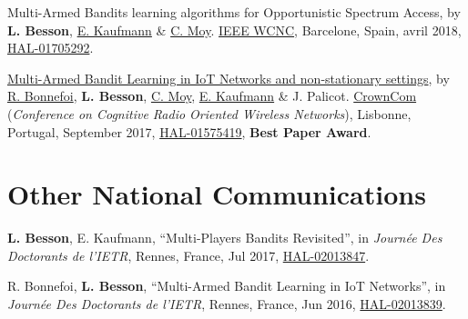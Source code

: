 \begin{etaremune}
{  Multi-Armed Bandits learning algorithms for Opportunistic Spectrum
  Access}, by \textbf{L. Besson},
  \href{http://chercheurs.lille.inria.fr/ekaufman/research.html}{E.
  Kaufmann} \& \href{https://moychris.wordpress.com/}{C. Moy}.
  \href{http://wcnc2018.ieee-wcnc.org/}{IEEE WCNC}, Barcelone, Spain,
  avril 2018, \href{https://hal.inria.fr/hal-01705292}{HAL-01705292}.
  \cite{Besson2018WCNC}
\item
  \href{https://hal.inria.fr/hal-01575419/document}{Multi-Armed Bandit
  Learning in IoT Networks and non-stationary settings}, by
  \href{https://remibonnefoi.wordpress.com/}{R. Bonnefoi}, \textbf{L.
  Besson}, \href{https://moychris.wordpress.com/}{C. Moy},
  \href{http://chercheurs.lille.inria.fr/ekaufman/research.html}{E.
  Kaufmann} \& J. Palicot. \href{http://crowncom.org/2017/}{CrownCom}
  (\emph{Conference on Cognitive Radio Oriented Wireless Networks}),
  Lisbonne, Portugal, September 2017,
  \href{https://hal.inria.fr/hal-01575419}{HAL-01575419}, \textbf{Best Paper Award}.
  \cite{Bonnefoi17}
\end{etaremune}




\section*{Other National Communications}
\renewcommand{\labelenumi}{[ONC-\arabic{enumi}]}
\begin{etaremune}
	\item \textbf{L. Besson}, E. Kaufmann, ``Multi-Players Bandits Revisited'', in \emph{Journ\'{e}e Des Doctorants de l'IETR}, Rennes, France, Jul 2017, \href{https://hal.inria.fr/hal-02013847}{HAL-02013847}.
	\item	R. Bonnefoi, \textbf{L. Besson}, ``Multi-Armed Bandit Learning in IoT Networks'', in \emph{Journ\'{e}e Des Doctorants de l'IETR}, Rennes, France, Jun 2016, \href{https://hal.inria.fr/hal-02013839}{HAL-02013839}.
\end{etaremune}


